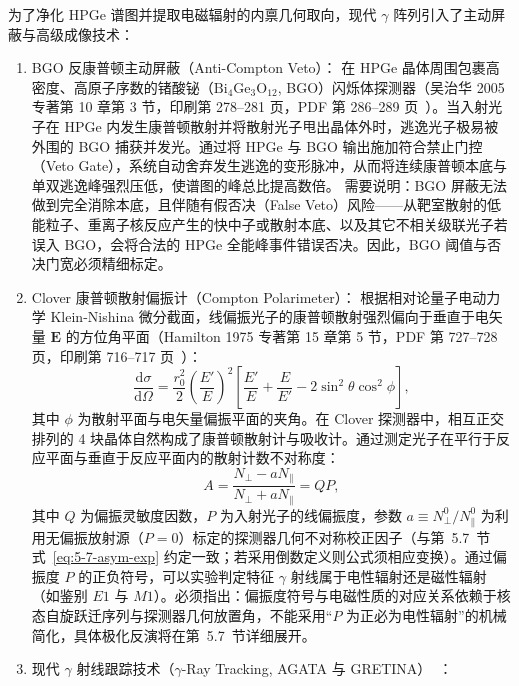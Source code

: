 为了净化 HPGe 谱图并提取电磁辐射的内禀几何取向，现代 $\gamma$ 阵列引入了主动屏蔽与高级成像技术：
\begin{enumerate}
\item BGO 反康普顿主动屏蔽（Anti-Compton Veto）：
在 HPGe 晶体周围包裹高密度、高原子序数的锗酸铋（$\mathrm{Bi}_4\mathrm{Ge}_3\mathrm{O}_{12}$, BGO）闪烁体探测器（吴治华 2005 专著第 10 章第 3 节，印刷第 278–281 页，PDF 第 286–289 页~\cite{book-wu-nuclear-experiment-methods}）。当入射光子在 HPGe 内发生康普顿散射并将散射光子甩出晶体外时，逃逸光子极易被外围的 BGO 捕获并发光。通过将 HPGe 与 BGO 输出施加符合禁止门控（Veto Gate），系统自动舍弃发生逃逸的变形脉冲，从而将连续康普顿本底与单双逃逸峰强烈压低，使谱图的峰总比提高数倍。
需要说明：BGO 屏蔽无法做到完全消除本底，且伴随有假否决（False Veto）风险——从靶室散射的低能粒子、重离子核反应产生的快中子或散射本底、以及其它不相关级联光子若误入 BGO，会将合法的 HPGe 全能峰事件错误否决。因此，BGO 阈值与否决门宽必须精细标定。
\item Clover 康普顿散射偏振计（Compton Polarimeter）：
根据相对论量子电动力学 Klein-Nishina 微分截面，线偏振光子的康普顿散射强烈偏向于垂直于电矢量 $\mathbf{E}$ 的方位角平面（Hamilton 1975 专著第 15 章第 5 节，PDF 第 727–728 页，印刷第 716–717 页~\cite{book-hamilton-electromagnetic-interaction}）：
\begin{equation}\label{eq:5-2-klein-nishina-pol}
\frac{\mathrm{d}\sigma}{\mathrm{d}\Omega} = \frac{r_0^2}{2} \left(\frac{E'}{E}\right)^2 \left[ \frac{E'}{E} + \frac{E}{E'} - 2\sin^2\theta \cos^2\phi \right],
\end{equation}
其中 $\phi$ 为散射平面与电矢量偏振平面的夹角。在 Clover 探测器中，相互正交排列的 4 块晶体自然构成了康普顿散射计与吸收计。通过测定光子在平行于反应平面与垂直于反应平面内的散射计数不对称度：
\begin{equation}\label{eq:5-2-asymmetry}
A = \frac{N_\perp - a N_\parallel}{N_\perp + a N_\parallel} = Q P,
\end{equation}
其中 $Q$ 为偏振灵敏度因数，$P$ 为入射光子的线偏振度，参数 $a \equiv N_\perp^0 / N_\parallel^0$ 为利用无偏振放射源（$P=0$）标定的探测器几何不对称校正因子（与第~5.7~节式~\eqref{eq:5-7-asym-exp} 约定一致；若采用倒数定义则公式须相应变换）。通过偏振度 $P$ 的正负符号，可以实验判定特征 $\gamma$ 射线属于电性辐射还是磁性辐射（如鉴别 $E1$ 与 $M1$）。必须指出：偏振度符号与电磁性质的对应关系依赖于核态自旋跃迁序列与探测器几何放置角，不能采用“$P$ 为正必为电性辐射”的机械简化，具体极化反演将在第~5.7~节详细展开。
\item 现代 $\gamma$ 射线跟踪技术（$\gamma$-Ray Tracking, AGATA 与 GRETINA）~\cite{akkoyun-2012-agata-instrument-response}：

\end{enumerate}
